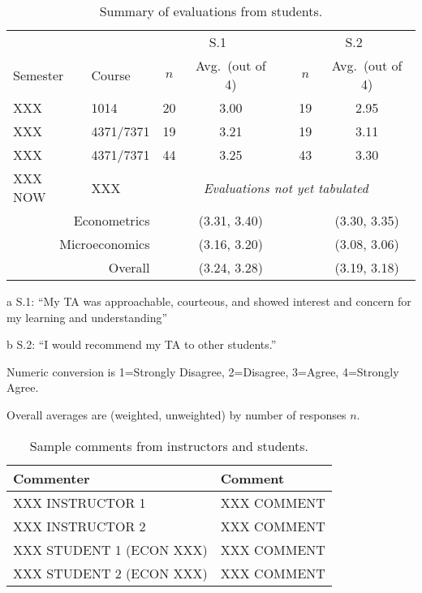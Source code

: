 \documentclass[letterpaper]{article}
\begin{document}
\begin{table}[htbp]
\centering
\caption{\label{tab:students}Summary of evaluations from students.}
\begin{threeparttable}
\begin{tabular}{llccccc}
\toprule
 & & \multicolumn{2}{c}{S.1\tnote{a}} && \multicolumn{2}{c}{S.2\tnote{b}} \\
\cmidrule{3-4}\cmidrule{6-7}
Semester     & Course & $n$ & Avg.\ (out of 4) && $n$ & Avg.\ (out of 4) \\
\midrule
XXX   & 1014      & 20 & 3.00 && 19 & 2.95 \\
XXX   & 4371/7371   & 19 & 3.21 && 19 & 3.11 \\
XXX   & 4371/7371   & 44 & 3.25 && 43 & 3.30 \\
XXX NOW & XXX & \multicolumn{5}{c}{\textit{Evaluations not yet tabulated}} \\
\midrule
\multicolumn{2}{r}{Econometrics} & & (3.31, 3.40) && & (3.30, 3.35) \\
\multicolumn{2}{r}{Microeconomics} & & (3.16, 3.20) && & (3.08, 3.06)  \\
\multicolumn{2}{r}{Overall}  & & (3.24, 3.28) && & (3.19, 3.18) \\
\bottomrule
\end{tabular}
% 
\begin{tablenotes}
 \item[a] S.1: ``My TA was approachable, courteous, and showed interest and concern for my learning and understanding''
 \item[b] S.2: ``I would recommend my TA to other students.''
 \item Numeric conversion is 1=Strongly Disagree, 2=Disagree, 3=Agree, 4=Strongly Agree.
 \item Overall averages are (weighted, unweighted) by number of responses $n$. 
\end{tablenotes}
\end{threeparttable}
\end{table}


\begin{table}[htbp]
\centering
\caption{\label{tab:comments}Sample comments from instructors and students.}
\begin{threeparttable}
\begin{tabular}{p{1in}p{5in}}
\toprule
Commenter & Comment  \\
\midrule
XXX INSTRUCTOR 1 & XXX COMMENT \\
XXX INSTRUCTOR 2 & XXX COMMENT \\
\midrule
XXX STUDENT 1 (ECON XXX) & XXX COMMENT \\
XXX STUDENT 2 (ECON XXX) & XXX COMMENT \\
\bottomrule
\end{tabular}
\end{threeparttable}
\end{table}
\end{document}
